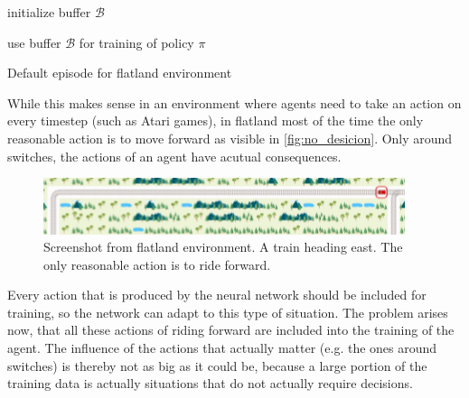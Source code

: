 \begin{algorithm}[H]
	initialize buffer $\mathcal{B}$\\

	use buffer $\mathcal{B}$ for training of policy $\pi$
	\caption{Default episode for flatland environment}
	\label{alg:no_reduction}
\end{algorithm}
While this makes sense in an environment where agents need to take an action on every timestep (such as Atari games), in flatland most of the time the only reasonable action is to move forward as visible in \autoref{fig:no_desicion}. Only around switches, the actions of an agent have acutual consequences.
\begin{figure}
	\centering
	\includegraphics[width=300pt]{images/screenshot_no_decision.png}
	\caption{Screenshot from flatland environment. A train heading east. The only reasonable action is to ride forward.}
	\label{fig:no_desicion}
\end{figure}
Every action that is produced by the neural network should be included for training, so the network can adapt to this type of situation. The problem arises now, that all these actions of riding forward are included into the training of the agent. The influence of the actions that actually matter (e.g. the ones around switches) is thereby not as big as it could be, because a large portion of the training data is actually situations that do not actually require decisions.\\
